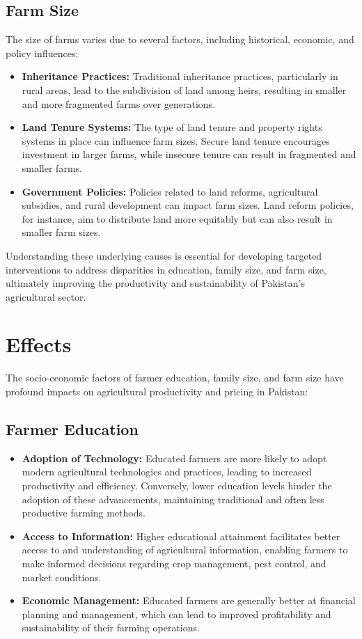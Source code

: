 \documentclass[12pt]{article}
\begin{document}
\subsection*{Farm Size}
The size of farms varies due to several factors, including historical, economic, and policy influences:
\begin{itemize}
    \item \textbf{Inheritance Practices:} Traditional inheritance practices, particularly in rural areas, lead to the subdivision of land among heirs, resulting in smaller and more fragmented farms over generations.
    \item \textbf{Land Tenure Systems:} The type of land tenure and property rights systems in place can influence farm sizes. Secure land tenure encourages investment in larger farms, while insecure tenure can result in fragmented and smaller farms.
    \item \textbf{Government Policies:} Policies related to land reforms, agricultural subsidies, and rural development can impact farm sizes. Land reform policies, for instance, aim to distribute land more equitably but can also result in smaller farm sizes.
\end{itemize}

Understanding these underlying causes is essential for developing targeted interventions to address disparities in education, family size, and farm size, ultimately improving the productivity and sustainability of Pakistan's agricultural sector.

\section{Effects}
The socio-economic factors of farmer education, family size, and farm size have profound impacts on agricultural productivity and pricing in Pakistan:

\subsection*{Farmer Education}
\begin{itemize}
    \item \textbf{Adoption of Technology:} Educated farmers are more likely to adopt modern agricultural technologies and practices, leading to increased productivity and efficiency. Conversely, lower education levels hinder the adoption of these advancements, maintaining traditional and often less productive farming methods.
    \item \textbf{Access to Information:} Higher educational attainment facilitates better access to and understanding of agricultural information, enabling farmers to make informed decisions regarding crop management, pest control, and market conditions.
    \item \textbf{Economic Management:} Educated farmers are generally better at financial planning and management, which can lead to improved profitability and sustainability of their farming operations.
\end{itemize}
\end{document}
